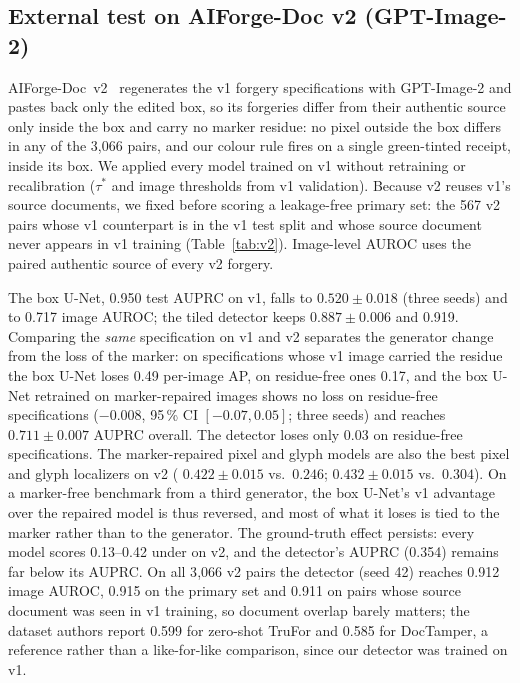
\subsection{External test on AIForge-Doc v2 (GPT-Image-2)}
\label{sec:res-v2}
AIForge-Doc~v2~\cite{wu2026aiforgedocv2} regenerates the v1 forgery specifications with GPT-Image-2 and pastes back only the edited box, so its forgeries differ from their authentic source only inside the box and carry no marker residue: no pixel outside the box differs in any of the 3{,}066 pairs, and our colour rule fires on a single green-tinted receipt, inside its box. We applied every model trained on v1 without retraining or recalibration ($\tau^*$ and image thresholds from v1 validation). Because v2 reuses v1's source documents, we fixed before scoring a leakage-free primary set: the 567 v2 pairs whose v1 counterpart is in the v1 test split and whose source document never appears in v1 training (Table~\ref{tab:v2}). Image-level AUROC uses the paired authentic source of every v2 forgery.

The box U-Net, 0.950 test AUPRC on v1, falls to $0.520{\pm}0.018$ (three seeds) and to 0.717 image AUROC; the tiled detector keeps $0.887{\pm}0.006$ and 0.919. Comparing the \emph{same} specification on v1 and v2 separates the generator change from the loss of the marker: on specifications whose v1 image carried the residue the box U-Net loses 0.49 per-image AP, on residue-free ones 0.17, and the box U-Net retrained on marker-repaired images shows no loss on residue-free specifications ($-0.008$, 95\,\% CI $[-0.07,0.05]$; three seeds) and reaches $0.711{\pm}0.007$ AUPRC overall. The detector loses only 0.03 on residue-free specifications. The marker-repaired pixel and glyph models are also the best pixel and glyph localizers on v2 (\GTp{} $0.422{\pm}0.015$ vs.\ $0.246$; \GTg{} $0.432{\pm}0.015$ vs.\ $0.304$). On a marker-free benchmark from a third generator, the box U-Net's v1 advantage over the repaired model is thus reversed, and most of what it loses is tied to the marker rather than to the generator. The ground-truth effect persists: every model scores 0.13--0.42 under \GTp{} on v2, and the detector's \GTp{} AUPRC (0.354) remains far below its \GTb{} AUPRC. On all 3{,}066 v2 pairs the detector (seed 42) reaches 0.912 image AUROC, 0.915 on the primary set and 0.911 on pairs whose source document was seen in v1 training, so document overlap barely matters; the dataset authors report 0.599 for zero-shot TruFor and 0.585 for DocTamper, a reference rather than a like-for-like comparison, since our detector was trained on v1.

